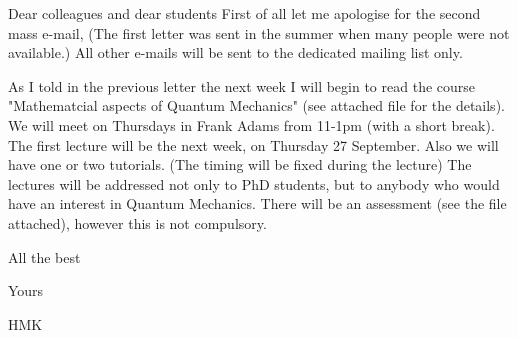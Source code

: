          Dear colleagues and dear students
    First of all   let me apologise  for the second  mass e-mail,
  (The first letter was sent in the summer when many people
were not available.)  All other e-mails  will be sent to the
dedicated mailing list only. 

   As I told in the previous letter  the next week I will begin to 
 read the course  "Mathematcial aspects of  Quantum Mechanics"  
(see attached file for the details).
  We will meet on Thursdays in Frank Adams from 11-1pm (with a short break).
The first lecture will be the next week,  on Thursday 27  September.
   Also we will have one or two tutorials. (The timing will be fixed
during the lecture)
   The lectures will be addressed not only to PhD students, 
but to anybody who would have an interest in Quantum Mechanics.
   There  will be an assessment (see the file attached), however this is not
compulsory.

   


   All the best

       Yours

                                       HMK
